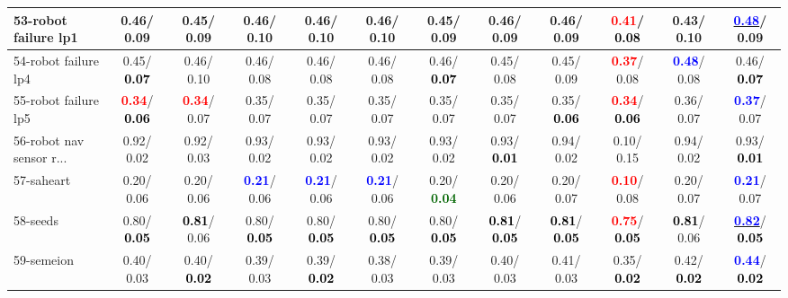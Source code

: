\begin{table}[h]
\begin{center}
{\begin{tabular}{lc|c|c|c|c|c|c|c|c|c|c}
53-robot failure lp1 &   0.46/  0.09 &   0.45/  0.09 &   0.46/  0.10 &   0.46/  0.10 &   0.46/  0.10 &   0.45/  0.09 &   0.46/  0.09 &   0.46/  0.09 & \textcolor{red}{\textbf{  0.41}}/\textcolor{black}{\textbf{  0.08}} &   0.43/  0.10 & \underline{\textcolor{blue}{\textbf{  0.48}}}/  0.09 \\ \hline
54-robot failure lp4 &   0.45/\textcolor{black}{\textbf{  0.07}} &   0.46/  0.10 &   0.46/  0.08 &   0.46/  0.08 &   0.46/  0.08 &   0.46/\textcolor{black}{\textbf{  0.07}} &   0.45/  0.08 &   0.45/  0.09 & \textcolor{red}{\textbf{  0.37}}/  0.08 & \textcolor{blue}{\textbf{  0.48}}/  0.08 &   0.46/\textcolor{black}{\textbf{  0.07}} \\
55-robot failure lp5 & \textcolor{red}{\textbf{  0.34}}/\textcolor{black}{\textbf{  0.06}} & \textcolor{red}{\textbf{  0.34}}/  0.07 &   0.35/  0.07 &   0.35/  0.07 &   0.35/  0.07 &   0.35/  0.07 &   0.35/  0.07 &   0.35/\textcolor{black}{\textbf{  0.06}} & \textcolor{red}{\textbf{  0.34}}/\textcolor{black}{\textbf{  0.06}} &   0.36/  0.07 & \textcolor{blue}{\textbf{  0.37}}/  0.07 \\
56-robot nav sensor r... &   0.92/  0.02 &   0.92/  0.03 &   0.93/  0.02 &   0.93/  0.02 &   0.93/  0.02 &   0.93/  0.02 &   0.93/\textcolor{black}{\textbf{  0.01}} &   0.94/  0.02 &   0.10/  0.15 &   0.94/  0.02 &   0.93/\textcolor{black}{\textbf{  0.01}} \\
57-saheart &   0.20/  0.06 &   0.20/  0.06 & \textcolor{blue}{\textbf{  0.21}}/  0.06 & \textcolor{blue}{\textbf{  0.21}}/  0.06 & \textcolor{blue}{\textbf{  0.21}}/  0.06 &   0.20/\textcolor{darkgreen}{\textbf{  0.04}} &   0.20/  0.06 &   0.20/  0.07 & \textcolor{red}{\textbf{  0.10}}/  0.08 &   0.20/  0.07 & \textcolor{blue}{\textbf{  0.21}}/  0.07 \\
58-seeds &   0.80/\textcolor{black}{\textbf{  0.05}} & \textcolor{black}{\textbf{  0.81}}/  0.06 &   0.80/\textcolor{black}{\textbf{  0.05}} &   0.80/\textcolor{black}{\textbf{  0.05}} &   0.80/\textcolor{black}{\textbf{  0.05}} &   0.80/\textcolor{black}{\textbf{  0.05}} & \textcolor{black}{\textbf{  0.81}}/\textcolor{black}{\textbf{  0.05}} & \textcolor{black}{\textbf{  0.81}}/\textcolor{black}{\textbf{  0.05}} & \textcolor{red}{\textbf{  0.75}}/\textcolor{black}{\textbf{  0.05}} & \textcolor{black}{\textbf{  0.81}}/  0.06 & \underline{\textcolor{blue}{\textbf{  0.82}}}/\textcolor{black}{\textbf{  0.05}} \\
59-semeion &   0.40/  0.03 &   0.40/\textcolor{black}{\textbf{  0.02}} &   0.39/  0.03 &   0.39/\textcolor{black}{\textbf{  0.02}} &   0.38/  0.03 &   0.39/  0.03 &   0.40/  0.03 &   0.41/  0.03 &   0.35/\textcolor{black}{\textbf{  0.02}} &   0.42/\textcolor{black}{\textbf{  0.02}} & \textcolor{blue}{\textbf{  0.44}}/\textcolor{black}{\textbf{  0.02}} \\

\end{tabular}}
\end{center}
\end{table}
